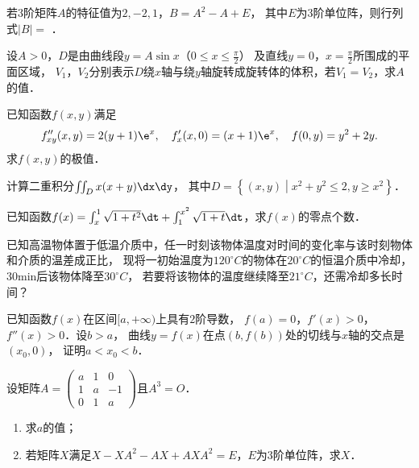 \documentclass[plain,noanswer,medmath]{../../template/jnuexam}
\begin{document}
\begin{problem}
若$3$阶矩阵$A$的特征值为$2, - 2,1$，$B = A^2 - A + E$，
其中$E$为$3$阶单位阵，则行列式$|B| =$ \fillin{}．
\end{problem}






\begin{problem}[points=10]
设$A > 0$，$D$是由曲线段$y = A\sin x$（$0 \le x \le \frac{\pi}{2}$）
及直线$y = 0$，$x = \frac{\pi}{2}$所围成的平面区域，
$V_1$，$V_2$分别表示$D$绕$x$轴与绕$y$轴旋转成旋转体的体积，若$V_1 = V_2$，求$A$的值．
\end{problem}


\begin{problem}[points=11]
已知函数$f(x,y)$满足
$$f''_{xy}(x,y) = 2(y + 1)\e^x,\quad f'_x(x,0) = (x + 1)\e^x,\quad f(0,y) = y^2 + 2y.$$
求$f(x,y)$的极值．
\end{problem}


\begin{problem}[points=10]
计算二重积分$\iint_D x(x + y)\dx\dy$，
其中$D = \left\{(x,y) \middle| x^2 + y^2 \le 2,y \ge x^2 \right\}$．
\end{problem}


\begin{problem}[points=11]
已知函数$f(x) = \int_x^1 \sqrt{1 + t^2} \dt + \int_1^{x^2} \sqrt{1 + t} \dt$，求$f(x)$的零点个数．
\end{problem}


\begin{problem}[points=10]
已知高温物体置于低温介质中，任一时刻该物体温度对时间的变化率与该时刻物体和介质的温差成正比，
现将一初始温度为$120^{\circ}C$的物体在$20^{\circ}C$的恒温介质中冷却，$30$min后该物体降至$30^{\circ}C$，
若要将该物体的温度继续降至$21^{\circ}C$，还需冷却多长时间？
\end{problem}


\begin{problem}[points=10]
已知函数$f(x)$在区间$[a,+\infty)$上具有$2$阶导数，
$f(a) = 0$，$f'(x) > 0$，$f''(x) > 0$．设$b > a$，
曲线$y = f(x)$在点$(b,f(b))$处的切线与$x$轴的交点是$(x_0,0)$，
证明$a < x_0 < b$．
\end{problem}


\begin{problem}[points=11]
设矩阵$A = \begin{pmatrix}
  a & 1 & 0 \\
  1 & a & -1 \\
  0 & 1 & a
\end{pmatrix}$且$A^3 = O$．
\begin{enumerate}
\item 求$a$的值；
\item 若矩阵$X$满足$X - XA^2 - AX + AX A^2 = E$，$E$为$3$阶单位阵，求$X$．
\end{enumerate}
\end{problem}


\end{document}
